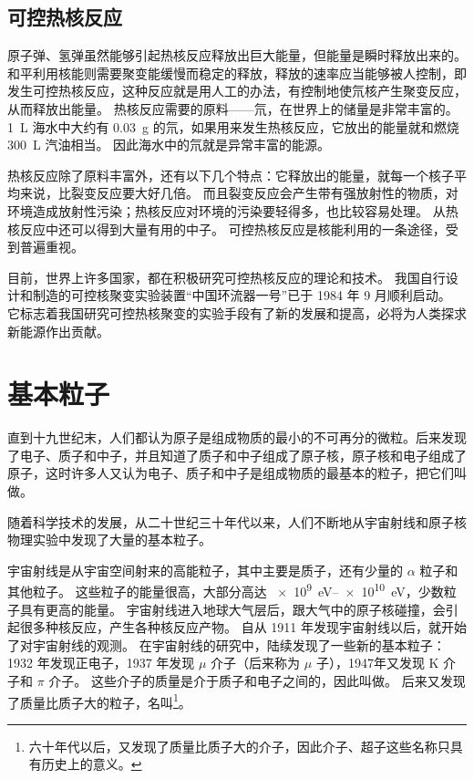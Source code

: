 \subsection{可控热核反应}
原子弹、氢弹虽然能够引起热核反应释放出巨大能量，但能量是瞬时释放出来的。
和平利用核能则需要聚变能缓慢而稳定的释放，释放的速率应当能够被人控制，即发生可控热核反应，这种反应就是用人工的办法，有控制地使氘核产生聚变反应，从而释放出能量。
热核反应需要的原料——氘，在世界上的储量是非常丰富的。
\qty{1}{L} 海水中大约有 \qty{0.03}{g} 的氘，如果用来发生热核反应，它放出的能量就和燃烧 \qty{300}{L} 汽油相当。
因此海水中的氘就是异常丰富的能源。

热核反应除了原料丰富外，还有以下几个特点：它释放出的能量，就每一个核子平均来说，比裂变反应要大好几倍。
而且裂变反应会产生带有强放射性的物质，对环境造成放射性污染；热核反应对环境的污染要轻得多，也比较容易处理。
从热核反应中还可以得到大量有用的中子。
可控热核反应是核能利用的一条途径，受到普遍重视。

目前，世界上许多国家，都在积极研究可控热核反应的理论和技术。
我国自行设计和制造的可控核聚变实验装置“中国环流器一号”已于 1984 年 9 月顺利启动。
它标志着我国研究可控热核聚变的实验手段有了新的发展和提高，必将为人类探求新能源作出贡献。

\section{基本粒子}\label{sec:elemetary_particle}
直到十九世纪末，人们都认为原子是组成物质的最小的不可再分的微粒。后来发现了电子、质子和中子，并且知道了质子和中子组成了原子核，原子核和电子组成了原子，这时许多人又认为电子、质子和中子是组成物质的最基本的粒子，把它们叫做。

随着科学技术的发展，从二十世纪三十年代以来，人们不断地从宇宙射线和原子核物理实验中发现了大量的基本粒子。

宇宙射线是从宇宙空间射来的高能粒子，其中主要是质子，还有少量的 $\alpha$ 粒子和其他粒子。
这些粒子的能量很高，大部分高达 \qtyrange{e9}{e10}{eV}，少数粒子具有更高的能量。
宇宙射线进入地球大气层后，跟大气中的原子核碰撞，会引起很多种核反应，产生各种核反应产物。
自从 1911 年发现宇宙射线以后，就开始了对宇宙射线的观测。
在宇宙射线的研究中，陆续发现了一些新的基本粒子：1932 年发现正电子，1937 年发现 $\mu$ 介子（后来称为 $\mu$ 子），1947年又发现 K 介子和 $\pi$ 介子。
这些介子的质量是介于质子和电子之间的，因此叫做。
后来又发现了质量比质子大的粒子，名叫\footnote{六十年代以后，又发现了质量比质子大的介子，因此介子、超子这些名称只具有历史上的意义。}。

